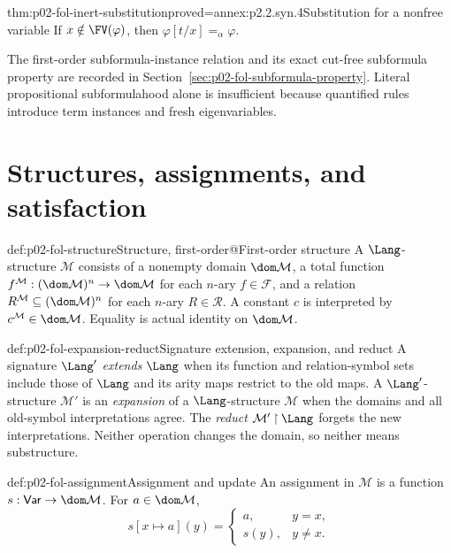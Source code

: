 \begin{hblemma}{thm:p02-fol-inert-substitution}{proved=annex:p2.2.syn.4}{Substitution for a nonfree variable}
If \(x\notin\FV(\varphi)\), then
\(\varphi[t/x]=_{\alpha}\varphi\).
\end{hblemma}

The first-order subformula-instance relation and its exact cut-free
subformula property are recorded in
Section~\ref{sec:p02-fol-subformula-property}.  Literal propositional
subformulahood alone is insufficient because quantified rules introduce term
instances and fresh eigenvariables.

\section{Structures, assignments, and satisfaction}
\label{sec:p02-fol-semantics}

\begin{hbdefinition}{def:p02-fol-structure}{Structure, first-order@First-order structure}
A \(\Lang\)-structure \(\mathcal M\) consists of a nonempty domain
\(\dom\mathcal M\), a total function
\(f^{\mathcal M}:(\dom\mathcal M)^n\to\dom\mathcal M\) for each \(n\)-ary
\(f\in\mathcal F\), and a relation
\(R^{\mathcal M}\subseteq(\dom\mathcal M)^n\) for each \(n\)-ary
\(R\in\mathcal R\).  A constant \(c\) is interpreted by
\(c^{\mathcal M}\in\dom\mathcal M\).  Equality is actual identity on
\(\dom\mathcal M\).
\end{hbdefinition}

\begin{hbdefinition}{def:p02-fol-expansion-reduct}{Signature extension, expansion, and reduct}
A signature \(\Lang'\) \emph{extends} \(\Lang\) when its function and
relation-symbol sets include those of \(\Lang\) and its arity maps restrict
to the old maps.  A \(\Lang'\)-structure \(\mathcal M'\) is an
\emph{expansion} of a \(\Lang\)-structure \(\mathcal M\) when the domains
and all old-symbol interpretations agree.  The \emph{reduct}
\(\mathcal M'\mathbin{\upharpoonright}\Lang\) forgets the new
interpretations.  Neither operation changes the domain, so neither means
substructure.
\end{hbdefinition}

\begin{hbdefinition}{def:p02-fol-assignment}{Assignment and update}
An assignment in \(\mathcal M\) is a function
\(s:\mathsf{Var}\to\dom\mathcal M\).  For \(a\in\dom\mathcal M\),
\[
 s[x\mapsto a](y)=
 \begin{cases}a,&y=x,\\s(y),&y\ne x.\end{cases}
\]
\end{hbdefinition}

